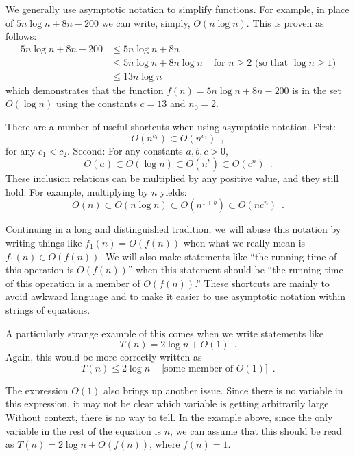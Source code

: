 We generally use asymptotic notation to simplify functions.  For example,
in place of $5n\log n + 8n - 200$ we can write, simply,  $O(n\log n)$.
This is proven as follows:
\begin{align*} 
       5n\log n + 8n - 200
        & \le 5n\log n + 8n \\
        & \le 5n\log n + 8n\log n & \mbox{ for $n\ge 2$ (so that $\log n \ge 1$)}
            \\
        & \le 13n\log n 
\end{align*}
which demonstrates that the function $f(n)=5n\log n + 8n - 200$ is in the set $O(\log n)$ using the constants $c=13$ and $n_0 = 2$.

There are a number of useful shortcuts when using asymptotic notation.  First:
\[ O(n^{c_1}) \subset O(n^{c_2}) \enspace ,\]
 for any $c_1 < c_2$.  Second:
For any constants $a,b,c > 0$,
\[ O(a) \subset O(\log n) \subset O(n^{b}) \subset O({c}^n) \enspace . \]
These inclusion relations can be multiplied by any positive value, and they still hold. For example, multiplying by $n$ yields:
\[ O(n) \subset O(n\log n) \subset O(n^{1+b}) \subset O(n{c}^n) \enspace . \]

Continuing in a long and distinguished tradition,
we will abuse this notation by writing things
like $f_1(n) = O(f(n))$ when what we really mean is $f_1(n) \in O(f(n))$.
We will also make statements like ``the running time of this operation
is $O(f(n))$'' when this statement should be ``the running time of
this operation is a member of $O(f(n))$.''  These shortcuts are mainly
to avoid awkward language and to make it easier to use asymptotic
notation within strings of equations.

A particularly strange example of this comes when we write statements like
\[
     T(n) = 2\log n + O(1)  \enspace .
\]
Again, this would be more correctly written as
\[
     T(n) \le 2\log n + [\mbox{some member of $O(1)$]}  \enspace .
\]

The expression $O(1)$ also brings up another issue. Since there is
no variable in this expression, it may not be clear which variable is
getting arbitrarily large.  Without context, there is no way to tell.
In the example above, since the only variable in the rest of the equation
is $n$, we can assume that this should be read as $T(n) = 2\log n + O(f(n))$,
where $f(n) = 1$.


